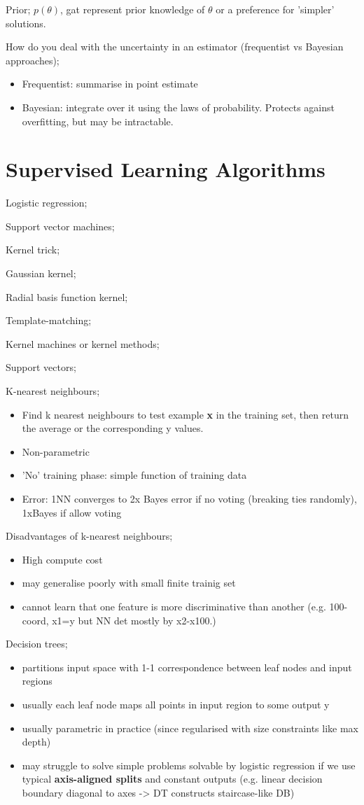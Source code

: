 \documentclass{article}
\begin{document}
Prior; $p(\theta)$, gat represent prior knowledge of $\theta$ or a preference for 'simpler' solutions.

How do you deal with the uncertainty in an estimator (frequentist vs Bayesian approaches); \begin{itemize} \item Frequentist: summarise in point estimate \item Bayesian: integrate over it using the laws of probability. Protects against overfitting, but may be intractable.  \end{itemize}

\section{Supervised Learning Algorithms}

Logistic regression;

Support vector machines;

Kernel trick;

Gaussian kernel;

Radial basis function kernel;

Template-matching;

Kernel machines or kernel methods;

Support vectors;

K-nearest neighbours; \begin{itemize} \item Find k nearest neighbours to test example \textbf{x} in the training set, then return the average or the corresponding y values.  \item Non-parametric \item 'No' training phase: simple function of training data \item Error: 1NN converges to 2x Bayes error if no voting (breaking ties randomly), 1xBayes if allow voting \end{itemize} 

Disadvantages of k-nearest neighbours; \begin{itemize} \item High compute cost \item may generalise poorly with small finite trainig set \item cannot learn that one feature is more discriminative than another (e.g. 100-coord, x1=y but NN det mostly by x2-x100.) \end{itemize}

Decision trees; \begin{itemize} \item partitions input space with 1-1 correspondence between leaf nodes and input regions \item usually each leaf node maps all points in input region to some output y \item usually parametric in practice (since regularised with size constraints like max depth) \item may struggle to solve simple problems solvable by logistic regression if we use typical \textbf{axis-aligned splits} and constant outputs (e.g. linear decision boundary diagonal to axes -> DT constructs staircase-like DB) \end{itemize}
\end{document}
